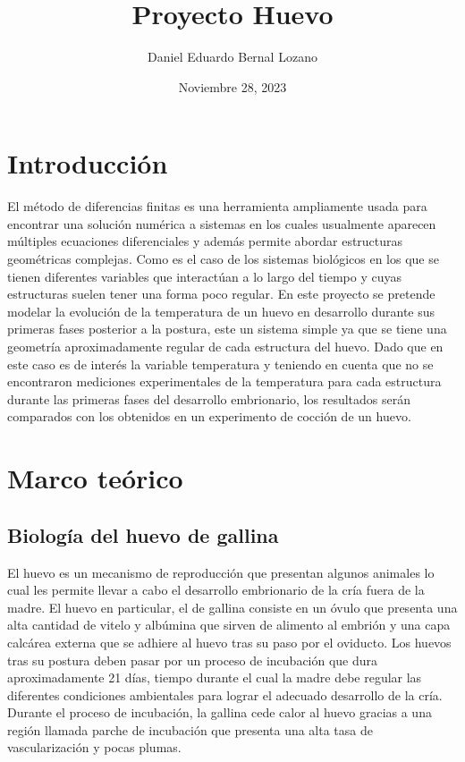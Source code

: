 \documentclass{article}
\title{Proyecto Huevo}
\author{Daniel Eduardo Bernal Lozano}
\date{Noviembre 28, 2023}
\begin{document}
	
	\maketitle
		
	\section{Introducción}
	
	El método de diferencias finitas es una herramienta ampliamente usada para encontrar una solución numérica a sistemas en los cuales usualmente aparecen múltiples ecuaciones diferenciales y además permite abordar estructuras geométricas complejas. Como es el caso de los sistemas biológicos en los que se tienen diferentes variables que interactúan a lo largo del tiempo y cuyas estructuras suelen tener una forma poco regular. En este proyecto se pretende modelar la evolución de la temperatura de un huevo en desarrollo durante sus primeras fases posterior a la postura, este un sistema simple ya que se tiene una geometría aproximadamente regular de cada estructura del huevo. Dado que en este caso es de interés la variable temperatura y teniendo en cuenta que no se encontraron mediciones experimentales de la temperatura para cada estructura durante las primeras fases del desarrollo embrionario, los resultados serán comparados con los obtenidos en un experimento de cocción de un huevo. 
	
	\vspace{0.5em}
	
	\section{Marco teórico}
	
	\subsection{Biología del huevo de gallina}
	
	El huevo es un mecanismo de reproducción que presentan algunos animales lo cual les permite llevar a cabo el desarrollo embrionario de la cría fuera de la madre. El huevo en particular, el de gallina consiste en un óvulo que presenta una alta cantidad de vitelo y albúmina que sirven de alimento al embrión y una capa calcárea externa que se adhiere al huevo tras su paso por el oviducto. Los huevos tras su postura deben pasar por un proceso de incubación que dura aproximadamente 21 días, tiempo durante el cual la madre debe regular las diferentes condiciones ambientales para lograr el adecuado desarrollo de la cría. Durante el proceso de incubación, la gallina cede calor al huevo gracias a una región llamada parche de incubación que presenta una alta tasa de vascularización y pocas plumas. \\
	
\end{document}
